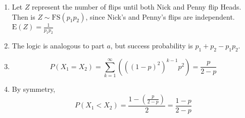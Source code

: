 \begin{enumerate}[label=(\alph*)]
\item Let $Z$ represent the number of flips until both Nick and Penny flip
Heads. Then is $Z \sim \text{FS}(p_{1}p_{2})$, since Nick's and
Penny's flips are independent. $\text{E}(Z) = \frac{1}{p_{1}p_{2}}$

\item The logic is analogous to part $a$, but success probability is $p_{1} + p_
{2} - p_{1}p_{2}$.

\item $$P(X_{1} = X_{2}) = \sum_{k=1}^{\infty}(((1-p)^{2})^{k-1}p^{2}) = 
\frac{p}{2-p}$$

\item By symmetry, $$P(X_{1} < X_{2}) = \frac{1-(\frac{p}{2-p})}{2} = \frac{1-p}
{2-p}$$
\end{enumerate}
